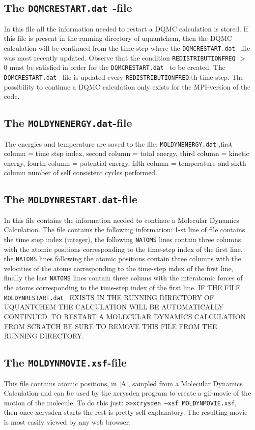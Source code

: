 \documentclass[a4paper,twoside,openany]{book}
\begin{document}
{{\subsection{The \texttt{DQMCRESTART.dat }-file}
In this file all the information needed to restart a DQMC calculation is stored. If this file is present in the running directory of uquantchem, then the DQMC  calculation will be continued from the time-step 
where the \texttt{DQMCRESTART.dat }-file was most recently updated. Observe that the condition \texttt{REDISTRIBUTIONFREQ} $>$ 0 must be satisfied  in order for the \texttt{DQMCRESTART.dat }
to be created. The \texttt{DQMCRESTART.dat }-file is updated every \texttt{REDISTRIBUTIONFREQ}:th time-step. The possibility to continue a DQMC calculation only exists for the MPI-version of the 
code.

\subsection{The \texttt{MOLDYNENERGY.dat}-file}
The energies and temperature are saved to the file: \texttt{MOLDYNENERGY.dat} ,first column = time step index, second column = total energy,
third column = kinetic energy, fourth column = potential energy, fifth column = temperature and sixth column number of self consistent cycles performed.

\subsection{The \texttt{MOLDYNRESTART.dat}-file}
In this file contains the information needed to continue a Molecular Dynamics Calculation. The file contains the following information: 1-st line of file contains the time step index (integer), the following 
\texttt{NATOMS} lines contain three columns with the atomic positions corresponding to the time-step index of the first line, the \texttt{NATOMS} lines following the atomic positions contain three columns 
with the velocities of the atoms corresponding to the time-step index of the first line, finally the last \texttt{NATOMS} lines  contain three colums with the interatomic forces of the atoms corresponding to the time-step index of the first line.
IF THE FILE \texttt{MOLDYNRESTART.dat } EXISTS IN THE RUNNING DIRECTORY OF UQUANTCHEM THE CALCULATION WILL BE AUTOMATICALLY CONTINUED. TO RESTART A MOLECULAR 
DYNAMICS CALCULATION FROM SCRATCH BE SURE TO REMOVE THIS FILE FROM THE RUNNING DIRECTORY.

\subsection{The \texttt{MOLDYNMOVIE.xsf}-file}
This file contains atomic positions, in $[$\AA$]$, sampled from a Molecular Dynamics Calculation and can be used by the xcrysden program to create a gif-movie of the motion of the molecule. To do this just:
\texttt{>>xcrysden --xsf MOLDYNMOVIE.xsf}, then once xcrysden starts the rest is pretty self explanatory. The resulting movie is most easily viewed by any web browser.


}}
\end{document}
